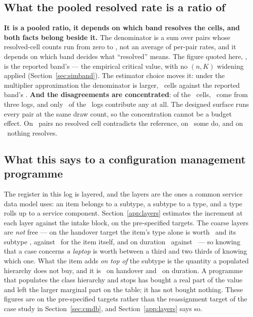 \subsection{What the pooled resolved rate is a ratio of}
\label{app:pooled}


\textbf{It is a pooled ratio, it depends on which band resolves the cells, and
both facts belong beside it.} The denominator is a sum over pairs whose
resolved-cell counts run from zero to \nResolvedMax, not an average of
per-pair rates, and it depends on which band decides what ``resolved'' means.
The figure quoted here, \misreportPooledResolvedPct, is the reported
band's --- the empirical critical value, with no $(n,K)$ widening applied
(Section~\ref{sec:simband}). The estimator choice moves it: under the
multiplier approximation the denominator is larger, \nResolvedWholeMult\
cells against the reported band's \nResolvedWholeEmp. \textbf{And the
disagreements are concentrated}: of the
\nDisagreeResolved\ cells, \nDisagreeTopThree\ come from three logs, and only
\nLogsDisagree\ of the \nLogs\ logs contribute any at all. The designed surface runs every pair at the same draw count, so the concentration cannot be a budget effect. On \nPairsNoResolvedDisagreement\ pairs no resolved
cell contradicts the reference, on \nPairsSomeResolvedDisagreement\ some do,
and on \nPairsNoResolvedCell\ nothing resolves.

\subsection{What this says to a configuration management programme}
\label{app:programme}
\label{sec:csdm}


The register in this log is layered, and the layers are the ones a common
service data model uses: an item belongs to a subtype, a subtype to a type,
and a type rolls up to a service component. Section~\ref{app:layers}
estimates the increment at each layer against the intake block, on the
pre-specified targets. The coarse layers are \emph{not} free --- on the handover
target the item's type alone is worth \layerTypeHandover\ and its subtype
\layerSubtypeHandover, against \layerItemHandover\ for the item itself, and on
duration \layerTypeDuration\ against \layerItemDuration\ --- so knowing that a
case concerns \emph{a laptop} is worth between a third and two thirds of
knowing which one. What the item adds \emph{on top of} the subtype is the
quantity a populated hierarchy does not buy, and it is
\layerItemMarginalHandover\ on handover and \layerItemMarginalDuration\ on
duration. A programme that populates the class hierarchy and stops has bought
a real part of the value and left the larger marginal part on the table; it
has not bought nothing. These figures are on the pre-specified targets rather
than the reassignment target of the case study in Section~\ref{sec:cmdb},
and Section~\ref{app:layers} says so.

